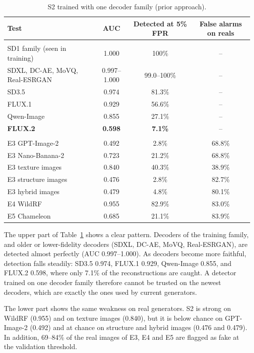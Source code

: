 \begin{table}[H]
\centering
\small
\caption{S2 trained with one decoder family (prior approach).}
\label{tab:s2prior}
\begin{tabular}{>{\raggedright\arraybackslash}p{5.0cm} c c c}
\toprule
\textbf{Test} & \textbf{AUC} & \textbf{Detected at 5\% FPR} & \textbf{False alarms on reals} \\
\midrule
\multicolumn{4}{l}{\textit{Validation: real vs.\ reconstructions by each decoder}} \\
SD1 family (seen in training) & 1.000 & 100\% & -- \\
SDXL, DC-AE, MoVQ, Real-ESRGAN & 0.997--1.000 & 99.0--100\% & -- \\
SD3.5 & 0.974 & 81.3\% & -- \\
FLUX.1 & 0.929 & 56.6\% & -- \\
Qwen-Image & 0.855 & 27.1\% & -- \\
\textbf{FLUX.2} & \textbf{0.598} & \textbf{7.1\%} & -- \\
\midrule
\multicolumn{4}{l}{\textit{Test sets (unseen generators)}} \\
E3 GPT-Image-2 & 0.492 & 2.8\% & 68.8\% \\
E3 Nano-Banana-2 & 0.723 & 21.2\% & 68.8\% \\
E3 texture images & 0.840 & 40.3\% & 38.9\% \\
E3 structure images & 0.476 & 2.8\% & 82.7\% \\
E3 hybrid images & 0.479 & 4.8\% & 80.1\% \\
E4 WildRF & 0.955 & 82.9\% & 83.0\% \\
E5 Chameleon & 0.685 & 21.1\% & 83.9\% \\
\bottomrule
\end{tabular}
\end{table}

The upper part of Table~\ref{tab:s2prior} shows a clear pattern. Decoders of the training family, and older or lower-fidelity decoders (SDXL, DC-AE, MoVQ, Real-ESRGAN), are detected almost perfectly (AUC 0.997--1.000). As decoders become more faithful, detection falls steadily: SD3.5 0.974, FLUX.1 0.929, Qwen-Image 0.855, and FLUX.2 0.598, where only 7.1\% of the reconstructions are caught. A detector trained on one decoder family therefore cannot be trusted on the newest decoders, which are exactly the ones used by current generators.

The lower part shows the same weakness on real generators. S2 is strong on WildRF (0.955) and on texture images (0.840), but it is below chance on GPT-Image-2 (0.492) and at chance on structure and hybrid images (0.476 and 0.479). In addition, 69--84\% of the real images of E3, E4 and E5 are flagged as fake at the validation threshold.

